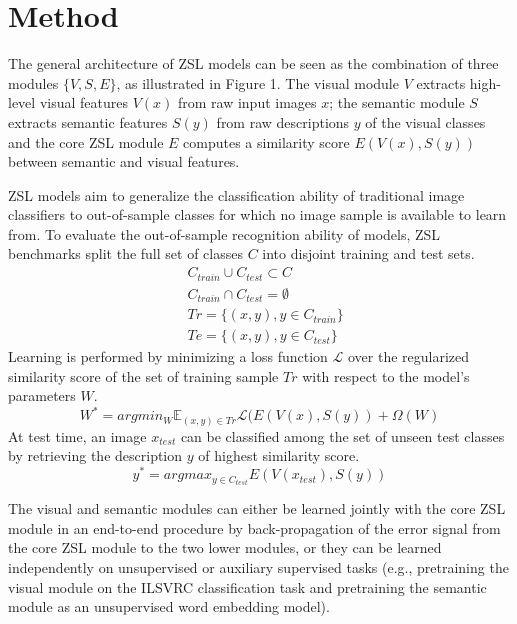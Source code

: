 \section{Method}

The general architecture of ZSL models can be seen as the combination of three modules $\{V,S,E\}$, as illustrated in Figure 1. The visual module $V$ extracts high-level visual features $V(x)$ from raw input images $x$; the semantic module $S$ extracts semantic features $S(y)$ from raw descriptions $y$ of the visual classes and the core ZSL module $E$ computes a similarity score $E(V(x), S(y))$ between semantic and visual features. 

ZSL models aim to generalize the classification ability of traditional image classifiers to out-of-sample classes for which no image sample is available to learn from. To evaluate the out-of-sample recognition ability of models, ZSL benchmarks split the full set of classes $C$ into disjoint training and test sets.
\begin{subequations} 
\begin{align}
& C_{train} \cup C_{test} \subset C \\
& C_{train} \cap C_{test} = \emptyset \\
& Tr = \{(x,y), y \in C_{train}\} \\
& Te = \{(x,y), y \in C_{test}\} 
\end{align}
\end{subequations} 
Learning is performed by minimizing a loss function $\mathcal{L}$ over the regularized similarity score of the set of training sample $Tr$ with respect to the model's parameters $W$.  
\begin{equation} 
W^{*} = argmin_{W} \mathbb{E}_{(x,y) \in Tr}\mathcal{L}(E(V(x),S(y)) + \Omega(W)
\end{equation} 
At test time, an image $x_{test}$ can be classified among the set of unseen test classes by retrieving the description $y$ of highest similarity score.
\begin{equation} 
y^{*} = argmax_{y \in C_{test}}E(V(x_{test}), S(y))
\end{equation} 

The visual and semantic modules can either be learned jointly with the core ZSL module in an end-to-end procedure by back-propagation of the error signal from the core ZSL module to the two lower modules, or they can be learned independently on unsupervised or auxiliary supervised tasks (e.g., pretraining the visual module on the ILSVRC classification task and pretraining the semantic module as an unsupervised word embedding model). 

